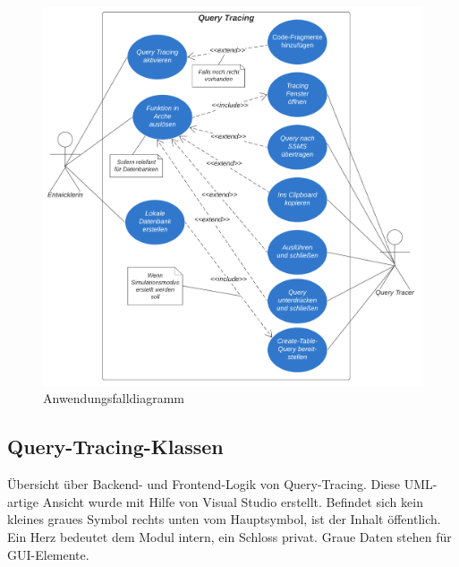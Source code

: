\documentclass[11pt,toc=sectionentrywithoutdots, 
headheight=44pt, headings=optiontoheadandtoc, hyperfootnotes=false, hypertexnames=false]{scrartcl}
\begin{document}
 \begin{figure}[htp]

	\includegraphics[scale=1.1]{Anwendungsfalldiagramm.png}
	 \caption{Anwendungsfalldiagramm}
 \end{figure}
 \clearpage
 
 \subsection{Query-Tracing-Klassen}
Übersicht über Backend- und Frontend-Logik von Query-Tracing. Diese \acs{UML}-artige Ansicht wurde mit Hilfe von Visual Studio erstellt. Befindet sich kein kleines graues Symbol rechts unten vom Hauptsymbol, ist der Inhalt \glqq öffentlich\grqq{}. Ein Herz bedeutet dem Modul \glqq intern\grqq{}, ein Schloss \glqq privat\grqq{}. Graue Daten stehen für GUI-Elemente.
 \label{fig:Query-Tracing-Klassen}
\end{document}
